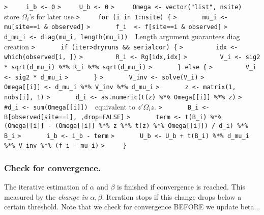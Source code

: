 \documentclass[a4paper]{article}
\begin{document}
\verb~>     i_b <- 0~\newline
\verb~>     U_b <- 0~\newline
\verb~>     Omega <- vector("list", nsite)  ~{\sffamily store $\Omega_i$'s for later use}\newline
\verb~>     for (i in 1:nsite) {~\newline
\verb~>       mu_i <- mu[site==i & observed]~\newline
\verb~>       f_i  <- f[site==i & observed]~\newline
\verb~>       d_mu_i <- diag(mu_i, length(mu_i))  ~{\sffamily Length argument guarantees diag creation}\newline
\verb~>       if (iter>dryruns && serialcor) {~\newline
\verb~>         idx <- which(observed[i, ])~\newline
\verb~>         R_i <- Rg[idx,idx]~\newline
\verb~>         V_i <- sig2 * sqrt(d_mu_i) %*% R_i %*% sqrt(d_mu_i)~\newline
\verb~>       } else {~\newline
\verb~>         V_i <- sig2 * d_mu_i~\newline
\verb~>       }~\newline
\verb~>       V_inv <- solve(V_i)~\newline
\verb~>       Omega[[i]] <- d_mu_i %*% V_inv %*% d_mu_i~\newline
\verb~>       z <- matrix(1, nobs[i], 1)~\newline
\verb~>       d_i <- as.numeric(t(z) %*% Omega[[i]] %*% z)~\newline
\verb~>       #d_i <- sum(Omega[[i]])  ~{\sffamily equivalent to $z' \Omega_i z$.}\newline
\verb~>       B_i <- B[observed[site==i], ,drop=FALSE]~\newline
\verb~>       term <- t(B_i) %*% (Omega[[i]] - (Omega[[i]] %*% z %*% t(z) %*% Omega[[i]]) / d_i) %*% B_i~\newline
\verb~>       i_b <- i_b - term~\newline
\verb~>       U_b <- U_b + t(B_i) %*% d_mu_i %*% V_inv %*% (f_i - mu_i)~\newline
\verb~>     }~\par



\subsubsection{Check for convergence.}
The iterative estimation of $\alpha$ and $\beta$ is finished if convergence is reached.
This measured by the \emph{change in} $\alpha, \beta$.
Iteration stops if this change drops below a certain threshold.
Note that we check for convergence BEFORE we update beta...\par
\end{document}
